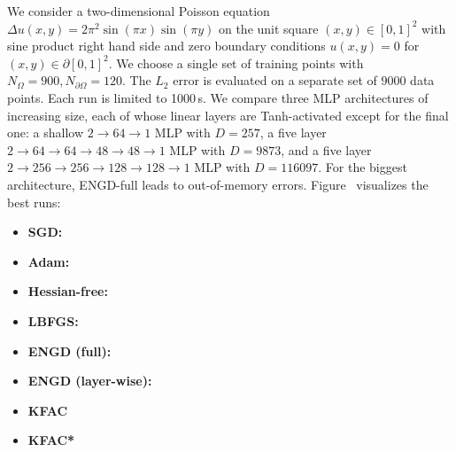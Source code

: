 We consider a two-dimensional Poisson equation $\Delta u(x, y) = 2 \pi^2 \sin(\pi x) \sin(\pi y)$ on the unit square $(x,y) \in [0, 1]^2$ with sine product right hand side and zero boundary conditions $u(x, y) = 0$ for $(x,y) \in \partial [0,1]^2$.
We choose a single set of training points with $N_{\Omega} = 900, N_{\partial\Omega} = 120$.
The $L_2$ error is evaluated on a separate set of $\num{9000}$ data points.
Each run is limited to 1000\,s.
We compare three MLP architectures of increasing size, each of whose linear layers are Tanh-activated except for the final one: a shallow $2\to64\to1$ MLP with $D=257$, a five layer $2 \to 64 \to 64 \to 48 \to 48 \to 1$ MLP with $D=\num{9873}$, and a five layer $2 \to 256 \to 256\to 128 \to 128 \to 1$ MLP with $D=\num{116097}$.
For the biggest architecture, ENGD-full leads to out-of-memory errors.
Figure~ visualizes the best runs:
\begin{itemize}
  \def\pathToRuns{../kfac_pinns_exp/exp09_reproduce_poisson2d/tex}
\item \textbf{SGD:} 
\item \textbf{Adam:} 
\item \textbf{Hessian-free:} 
\item \textbf{LBFGS:} 
\item \textbf{ENGD (full):} 
\item \textbf{ENGD (layer-wise):} 
\item \textbf{KFAC} 
\item \textbf{KFAC*} 
\end{itemize}

